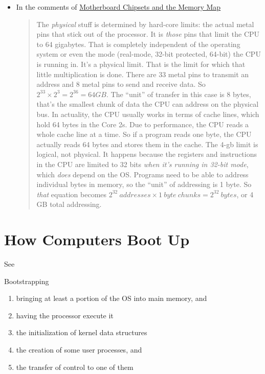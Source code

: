 \begin{itemize}
\item In the comments of
  \href{http://duartes.org/gustavo/blog/post/motherboard-chipsets-memory-map}{Motherboard
    Chipsets and the Memory Map}
  \begin{quote}
    The \emph{physical} stuff is determined by hard-core limits: the actual metal pins
    that stick out of the processor. It is \emph{those} pins that limit the CPU to 64
    gigabytes. That is completely independent of the operating system or even the mode
    (real-mode, 32-bit protected, 64-bit) the CPU is running in. It’s a physical
    limit. That is the limit for which that little multiplication is done. There are 33
    metal pins to transmit an address and 8 metal pins to send and receive data. So
    $2^{33}\times{} 2^3 = 2^{36} = 64 GB$.  The “unit” of transfer in this case is 8
    bytes, that’s the smallest chunk of data the CPU can address on the physical bus. In
    actuality, the CPU usually works in terms of cache lines, which hold 64 bytes in the
    Core 2s. Due to performance, the CPU reads a whole cache line at a time. So if a
    program reads one byte, the CPU actually reads 64 bytes and stores them in the cache.
    The 4-gb limit is logical, not physical. It happens because the registers and
    instructions in the CPU are limited to 32 bits \emph{when it’s running in 32-bit
      mode}, which \emph{does} depend on the OS. Programs need to be able to address
    individual bytes in memory, so the “unit” of addressing is 1 byte. So \emph{that}
    equation becomes $2^{32}\ addresses \times{} 1\ byte\ chunks = 2^{32}\ bytes$, or 4 GB
    total addressing.
  \end{quote}
\end{itemize}

\section{How Computers Boot Up}
\label{sec:how-computers-boot}

See \cite{gustavo2008boot}

\begin{frame}{Bootstrapping}
  \begin{center}
  \end{center}
  \begin{enumerate}
  \item bringing at least a portion of the OS into main memory, and
  \item having the processor execute it
  \item the initialization of kernel data structures
  \item the creation of some user processes, and
  \item the transfer of control to one of them
  \end{enumerate}
  \begin{center}
  \end{center}
\end{frame}

